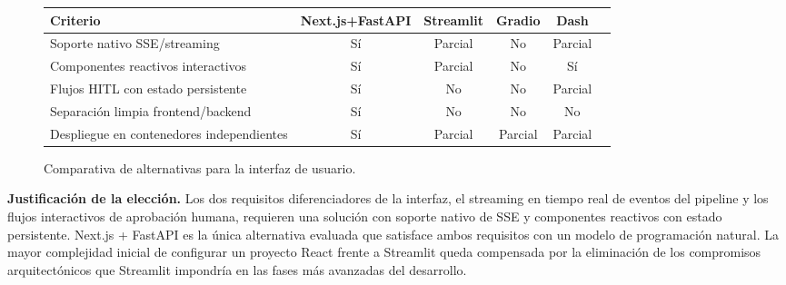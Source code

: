 \begin{figure}[H]
\centering
\begin{tabular}{lccccc}
\hline
\textbf{Criterio} & \textbf{Next.js+FastAPI} & \textbf{Streamlit} & \textbf{Gradio} & \textbf{Dash} \\
\hline
Soporte nativo SSE/streaming & Sí & Parcial & No & Parcial \\
Componentes reactivos interactivos & Sí & Parcial & No & Sí \\
Flujos HITL con estado persistente & Sí & No & No & Parcial \\
Separación limpia frontend/backend & Sí & No & No & No \\
Despliegue en contenedores independientes & Sí & Parcial & Parcial & Parcial \\
\hline
\end{tabular}
\caption{Comparativa de alternativas para la interfaz de usuario.}
\label{tab:alt-frontend}
\end{figure}

\textbf{Justificación de la elección.} Los dos requisitos diferenciadores de la interfaz, el streaming en tiempo real de eventos del pipeline y los flujos interactivos de aprobación humana, requieren una solución con soporte nativo de SSE y componentes reactivos con estado persistente. Next.js + FastAPI es la única alternativa evaluada que satisface ambos requisitos con un modelo de programación natural. La mayor complejidad inicial de configurar un proyecto React frente a Streamlit queda compensada por la eliminación de los compromisos arquitectónicos que Streamlit impondría en las fases más avanzadas del desarrollo.
